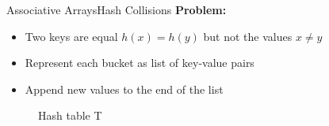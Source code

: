 \begin{frame}{Associative Arrays}{Hash Collisions}
  \textbf{Problem:}
  \begin{itemize}
    \item
      Two keys are equal {\color{MainA} $h(x) = h(y)$} but not the values
      {\color{MainA} $x \neq y$}
  \end{itemize}
  \begin{itemize}
    \item<3->
      Represent each bucket as list of key-value pairs
    \item<4->
      Append new values to the end of the list
  \end{itemize}
    \vspace*{-1.0em}
    \begin{figure}
    \caption{Hash table T}
    \centering
  \end{figure}
\end{frame}



